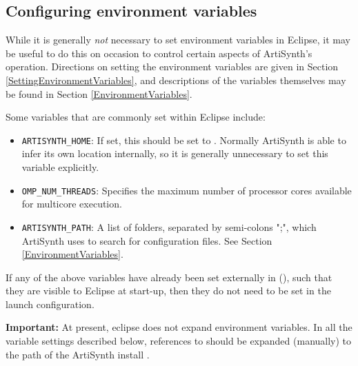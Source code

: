 \subsection{Configuring environment variables}
\label{EclipseEnvironmentVariables}

While it is generally {\it not} necessary to set environment variables
in Eclipse, it may be useful to do this on occasion to control certain
aspects of ArtiSynth's operation.  Directions on setting the
environment variables are given in
Section \ref{SettingEnvironmentVariables}, and descriptions of the
variables themselves may be found in
Section \ref{EnvironmentVariables}.

Some variables that are commonly set within Eclipse include:

\begin{itemize}

\item {\tt ARTISYNTH\_HOME}: If set, this should be set to
\ArtHome[]. Normally ArtiSynth is able to infer its own location
internally, so it is generally unnecessary to set this variable
explicitly.

\item {\tt OMP\_NUM\_THREADS}: Specifies the maximum number of processor cores
available for multicore execution.

\item {\tt ARTISYNTH\_PATH}: A list of folders, separated by semi-colons ";", 
which ArtiSynth uses to search for configuration files. 
See Section \ref{EnvironmentVariables}.

\end{itemize}

If any of the above variables have already been set externally in
\SYSTEM{} (\environmentSectionRef), such that they are visible
to Eclipse at start-up, then they do not need to be set in the launch
configuration.


\ifNeedLibraryPath

\begin{sideblock}
{\bf Important:} At present, eclipse does not expand environment variables.
In all the variable settings described below, references to 
\ArtHome[]should be expanded (manually) to the path of the
ArtiSynth install \directory{}.
\end{sideblock}

